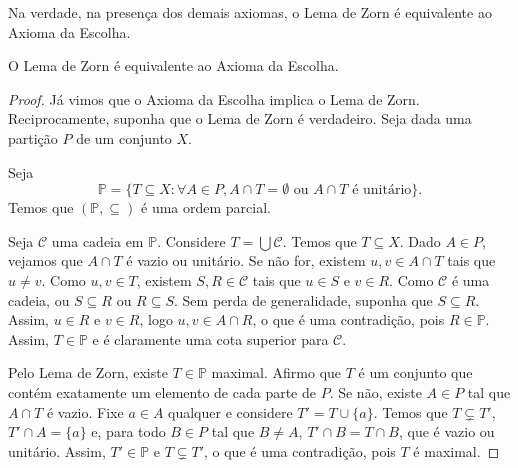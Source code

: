 Na verdade, na presença dos demais axiomas, o Lema de Zorn é equivalente ao Axioma da Escolha.

\begin{theorem}[$ZF^-$]
    O Lema de Zorn é equivalente ao Axioma da Escolha.
\end{theorem}
\begin{proof}
Já vimos que o Axioma da Escolha implica o Lema de Zorn.
Reciprocamente, suponha que o Lema de Zorn é verdadeiro.
Seja dada uma partição $P$ de um conjunto $X$.

Seja
\[
    \mathbb P = \{T\subseteq X: \forall A\in P, A\cap T=\emptyset \text{ ou } A\cap T \text{ é unitário}\}.
\]
Temos que $(\mathbb P, \subseteq)$ é uma ordem parcial.

Seja $\mathcal C$ uma cadeia em $\mathbb P$.
Considere $T=\bigcup \mathcal C$.
Temos que $T\subseteq X$.
Dado $A\in P$, vejamos que $A\cap T$ é vazio ou unitário.
Se não for, existem $u, v \in A\cap T$ tais que $u\neq v$.
Como $u, v \in T$, existem $S, R \in \mathcal C$ tais que $u\in S$ e $v\in R$.
Como $\mathcal C$ é uma cadeia, ou $S\subseteq R$ ou $R\subseteq S$.
Sem perda de generalidade, suponha que $S\subseteq R$.
Assim, $u\in R$ e $v\in R$, logo $u, v \in A\cap R$, o que é uma contradição, pois $R\in \mathbb P$.
Assim, $T\in \mathbb P$ e é claramente uma cota superior para $\mathcal C$.

Pelo Lema de Zorn, existe $T\in \mathbb P$ maximal.
Afirmo que $T$ é um conjunto que contém exatamente um elemento de cada parte de $P$.
Se não, existe $A\in P$ tal que $A\cap T$ é vazio.
Fixe $a \in A$ qualquer e considere $T'=T\cup \{a\}$.
Temos que $T\subsetneq T'$, $T'\cap A=\{a\}$ e, para todo $B\in P$ tal que $B\neq A$, $T'\cap B=T\cap B$, que é vazio ou unitário.
Assim, $T'\in \mathbb P$ e $T\subsetneq T'$, o que é uma contradição, pois $T$ é maximal.
\end{proof}

